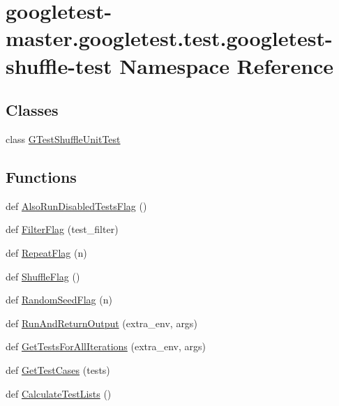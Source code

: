\hypertarget{namespacegoogletest-master_1_1googletest_1_1test_1_1googletest-shuffle-test}{}\section{googletest-\/master.googletest.\+test.\+googletest-\/shuffle-\/test Namespace Reference}
\label{namespacegoogletest-master_1_1googletest_1_1test_1_1googletest-shuffle-test}
\subsection*{Classes}
\begin{DoxyCompactItemize}
\item 
class \mbox{\hyperlink{classgoogletest-master_1_1googletest_1_1test_1_1googletest-shuffle-test_1_1_g_test_shuffle_unit_test}{G\+Test\+Shuffle\+Unit\+Test}}
\end{DoxyCompactItemize}
\subsection*{Functions}
\begin{DoxyCompactItemize}
\item 
def \mbox{\hyperlink{namespacegoogletest-master_1_1googletest_1_1test_1_1googletest-shuffle-test_a49d84c9e10fa904bfdaf7b524d240fc4}{Also\+Run\+Disabled\+Tests\+Flag}} ()
\item 
def \mbox{\hyperlink{namespacegoogletest-master_1_1googletest_1_1test_1_1googletest-shuffle-test_a5ec4842a8aadf5951535e2b0da4f8e7f}{Filter\+Flag}} (test\+\_\+filter)
\item 
def \mbox{\hyperlink{namespacegoogletest-master_1_1googletest_1_1test_1_1googletest-shuffle-test_a0a250bbaf2ebb6582da1d077735a3966}{Repeat\+Flag}} (n)
\item 
def \mbox{\hyperlink{namespacegoogletest-master_1_1googletest_1_1test_1_1googletest-shuffle-test_a69c745d55f668057397774ea1126404f}{Shuffle\+Flag}} ()
\item 
def \mbox{\hyperlink{namespacegoogletest-master_1_1googletest_1_1test_1_1googletest-shuffle-test_a0c7133f025e23be1b95a9f0ae34563ec}{Random\+Seed\+Flag}} (n)
\item 
def \mbox{\hyperlink{namespacegoogletest-master_1_1googletest_1_1test_1_1googletest-shuffle-test_a326f5fcf5098400942a26c5206935fa8}{Run\+And\+Return\+Output}} (extra\+\_\+env, args)
\item 
def \mbox{\hyperlink{namespacegoogletest-master_1_1googletest_1_1test_1_1googletest-shuffle-test_a140dbf3b6aebd523a89a2f420190d940}{Get\+Tests\+For\+All\+Iterations}} (extra\+\_\+env, args)
\item 
def \mbox{\hyperlink{namespacegoogletest-master_1_1googletest_1_1test_1_1googletest-shuffle-test_a175d0af05e1ad25db231bb5302cc8951}{Get\+Test\+Cases}} (tests)
\item 
def \mbox{\hyperlink{namespacegoogletest-master_1_1googletest_1_1test_1_1googletest-shuffle-test_a381a9c63c0567dab9fce267c316a10f8}{Calculate\+Test\+Lists}} ()
\end{DoxyCompactItemize}
